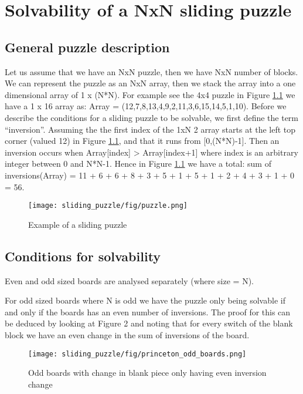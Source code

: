 \graphicspath{{sliding\_puzzle/fig}}
\chapter{Solvability of a NxN sliding puzzle}
\label{chap:Solvability of a NxN sliding puzzle}
\section{General puzzle description}
Let us assume that we have an NxN puzzle, then we have NxN number of blocks. We can represent the puzzle as an NxN array, then we stack the array into a one dimensional array of 1 x (N*N). For example see the 4x4 puzzle in Figure \ref{fig:sliding_puzzle} we have a 1 x 16 array as: 
Array = (12,7,8,13,4,9,2,11,3,6,15,14,5,1,10).
Before we describe the conditions for a sliding puzzle to be solvable, we first define the term “inversion”. Assuming the the first index of the 1xN 2 array starts at the left top corner (valued 12) in
Figure \ref{fig:sliding_puzzle}, and that it runs from [0,(N*N)-1]. Then an inversion occurs when Array[index] >
Array[index+1] where index is an arbitrary integer between 0 and N*N-1. Hence in Figure \ref{fig:sliding_puzzle} we have a
total: sum of inversions(Array) = 11 + 6 + 6 + 8 + 3 + 5 + 1 + 5 + 1 + 2 + 4 + 3 + 1 + 0 = 56.

\begin{figure}[!htb]
	\centering
	\texttt{[image: sliding\_puzzle/fig/puzzle.png]}
	\caption{Example of a sliding puzzle}
	\label{fig:sliding_puzzle}
\end{figure}

\section{Conditions for solvability}
Even and odd sized boards are analysed separately (where size = N).

For odd sized boards where N is odd we have the puzzle only being solvable if and only if the boards
has an even number of inversions. The proof for this can be deduced by looking at Figure 2 and noting that for every switch of the blank block we have an even change in the sum of inversions of the board. \cite{princeton_8puzzle_assignment}

\begin{figure}[!htb]
	\centering
	\texttt{[image: sliding\_puzzle/fig/princeton\_odd\_boards.png]}
	\caption{Odd boards with change in blank piece only having even inversion change \cite{princeton_8puzzle_assignment}}
	\label{fig:sol_odd_board}
\end{figure}

